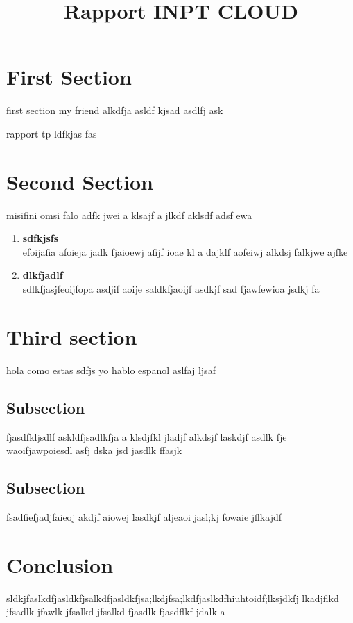 \documentclass{rapportINPTCLOUD}
\title{Rapport INPT CLOUD} %
\begin{document}





        
\fairemarges %
\fairepagedegarde %
\tabledematieres %




\section{First Section} 

first section my friend alkdfja asldf kjsad asdlfj ask

rapport tp ldfkjas fas

\section{Second Section}
misifini omsi falo adfk jwei a klsajf a jlkdf aklsdf adsf ewa

\begin{enumerate}
    \item \textbf{sdfkjsfs} \\
    efoijafia afoieja jadk fjaioewj afijf ioae kl a dajklf aofeiwj alkdsj falkjwe ajfke

    \item \textbf{dlkfjadlf} \\
    sdlkfjasjfeoijfopa asdjif aoije saldkfjaoijf asdkjf sad fjawfewioa jsdkj fa
\end{enumerate}



\section{Third section}
hola como estas sdfjs yo hablo espanol aslfaj ljsaf
\subsection{Subsection}

fjasdfkljsdlf  askldfjsadlkfja a klsdjfkl jladjf alkdsjf laskdjf asdlk fje waoifjawpoiesdl asfj dska jsd jasdlk ffasjk 

\subsection{Subsection}

fsadfiefjadjfaieoj akdjf aiowej lasdkjf aljeaoi jasl;kj fowaie jflkajdf 


\section{Conclusion}
sldkjfaslkdfjasldkfjsalkdfjasldkfjsa;lkdjfsa;lkdfjaslkdfhiuhtoidf;lksjdkfj lkadjflkd jfsadlk jfawlk jfsalkd jfsalkd fjasdlk fjasdflkf jdalk a
\end{document}
